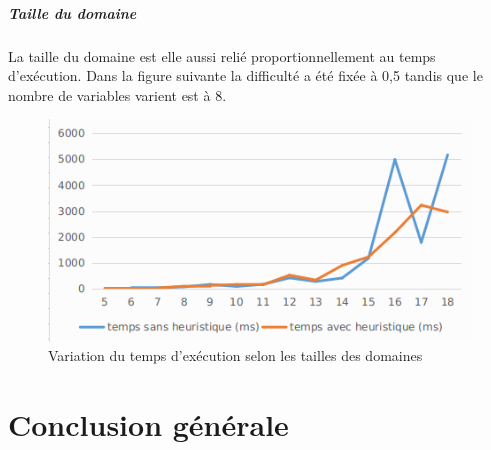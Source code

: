 \documentclass[12pt]{report}
\begin{document}
\paragraph{Taille du domaine}
La taille du domaine est elle aussi relié proportionnellement  au temps d’exécution. Dans la figure suivante la difficulté a été fixée à 0,5 tandis que le nombre de variables varient est à 8.
\begin{figure}[H]
	\centering
	\includegraphics[scale=0.5]{imgs/domain.png}
	\caption{Variation du temps d'exécution selon les tailles des domaines}
	\label{fig:doms}
\end{figure}
\chapter{Conclusion générale}
\paragraph{}
\end{document}

